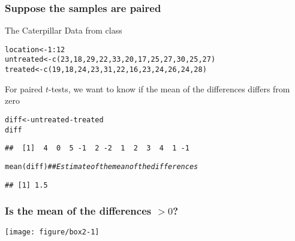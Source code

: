 \documentclass[color=usenames,dvipsnames]{beamer}\usepackage[]{graphicx}\usepackage[]{color}
\makeatletter
\newcommand{\hlnum}[1]{\textcolor[rgb]{0.69,0.494,0}{#1}}%
\newcommand{\hlcom}[1]{\textcolor[rgb]{0.514,0.506,0.514}{\textit{#1}}}%
\newcommand{\hlopt}[1]{\textcolor[rgb]{0,0,0}{#1}}%
\newcommand{\hlstd}[1]{\textcolor[rgb]{0,0,0}{#1}}%
\newcommand{\hlkwb}[1]{\textcolor[rgb]{0,0.341,0.682}{#1}}%
\newcommand{\hlkwd}[1]{\textcolor[rgb]{0.004,0.004,0.506}{#1}}%
\newenvironment{kframe}{%
 \def\at@end@of@kframe{}%
 \ifinner\ifhmode%
  \def\at@end@of@kframe{\end{minipage}}%
  \begin{minipage}{\columnwidth}%
 \fi\fi%
 \def\FrameCommand##1{\hskip\@totalleftmargin \hskip-\fboxsep
 \colorbox{shadecolor}{##1}\hskip-\fboxsep
     \hskip-\linewidth \hskip-\@totalleftmargin \hskip\columnwidth}%
 \MakeFramed {\advance\hsize-\width
   \@totalleftmargin\z@ \linewidth\hsize
   \@setminipage}}%
 {\par\unskip\endMakeFramed%
 \at@end@of@kframe}
\newenvironment{knitrout}{}{} %
\makeatother
\begin{document}
\begin{frame}[fragile]
  \frametitle{Suppose the samples are paired}
  {%
    The Caterpillar Data from class}
\begin{knitrout}
\color{fgcolor}\begin{kframe}
\begin{alltt}
\hlstd{location} \hlkwb{<-} \hlnum{1}\hlopt{:}\hlnum{12}
\hlstd{untreated} \hlkwb{<-} \hlkwd{c}\hlstd{(}\hlnum{23}\hlstd{,}\hlnum{18}\hlstd{,}\hlnum{29}\hlstd{,}\hlnum{22}\hlstd{,}\hlnum{33}\hlstd{,}\hlnum{20}\hlstd{,}\hlnum{17}\hlstd{,}\hlnum{25}\hlstd{,}\hlnum{27}\hlstd{,}\hlnum{30}\hlstd{,}\hlnum{25}\hlstd{,}\hlnum{27}\hlstd{)}
\hlstd{treated} \hlkwb{<-} \hlkwd{c}\hlstd{(}\hlnum{19}\hlstd{,}\hlnum{18}\hlstd{,}\hlnum{24}\hlstd{,}\hlnum{23}\hlstd{,}\hlnum{31}\hlstd{,}\hlnum{22}\hlstd{,}\hlnum{16}\hlstd{,}\hlnum{23}\hlstd{,}\hlnum{24}\hlstd{,}\hlnum{26}\hlstd{,}\hlnum{24}\hlstd{,}\hlnum{28}\hlstd{)}
\end{alltt}
\end{kframe}
\end{knitrout}
  \pause
  \vfill
  {%
    For paired $t$-tests, we want to know if the \alert{mean of the
    differences} differs from zero}
  \vfill
  \pause
\begin{knitrout}
\color{fgcolor}\begin{kframe}
\begin{alltt}
\hlstd{diff} \hlkwb{<-} \hlstd{untreated}\hlopt{-}\hlstd{treated}
\hlstd{diff}
\end{alltt}
\begin{verbatim}
##  [1]  4  0  5 -1  2 -2  1  2  3  4  1 -1
\end{verbatim}
\begin{alltt}
\hlkwd{mean}\hlstd{(diff)} \hlcom{## Estimate of the mean of the differences}
\end{alltt}
\begin{verbatim}
## [1] 1.5
\end{verbatim}
\end{kframe}
\end{knitrout}

\end{frame}





\begin{frame}[fragile]
  \frametitle{Is the mean of the differences $>0$?}
  \begin{center}
  \footnotesize

\vspace{-.2cm}
\texttt{[image: figure/box2-1]}
  \end{center}
\end{frame}
\end{document}
